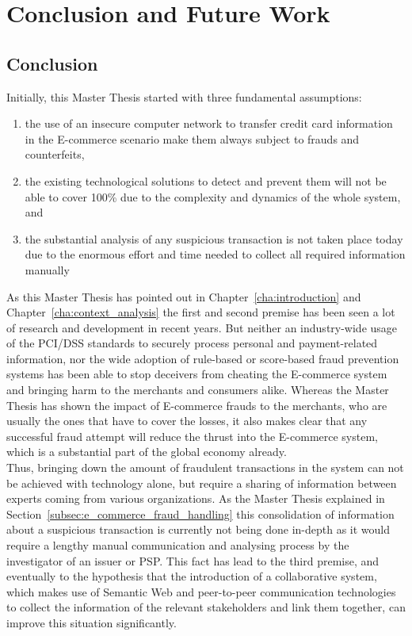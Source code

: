 
\chapter{Conclusion and Future Work} %
\label{cha:conclusion}

\section{Conclusion}
\label{sec:conclusion}

Initially, this Master Thesis started with three fundamental assumptions: \@

\begin{enumerate}
	\item the use of an insecure computer network to transfer credit card information in the \gls{E-commerce} scenario make them always subject to frauds and counterfeits,
	\item the existing technological solutions to detect and prevent them will not be able to cover 100\% due to the complexity and dynamics of the whole system, and
	\item the substantial analysis of any suspicious transaction is not taken place today due to the enormous effort and time needed to collect all required information manually
\end{enumerate}

As this Master Thesis has pointed out in Chapter~\ref{cha:introduction} and Chapter~\ref{cha:context_analysis} the first and second premise has been seen a lot of research and development in recent years. But neither an industry-wide usage of the \gls{PCI/DSS} standards to securely process personal and payment-related information, nor the wide adoption of rule-based or score-based fraud prevention systems has been able to stop deceivers from cheating the \gls{E-commerce} system and bringing harm to the merchants and consumers alike. Whereas the Master Thesis has shown the impact of \gls{E-commerce} frauds to the merchants, who are usually the ones that have to cover the losses, it also makes clear that any successful fraud attempt will reduce the thrust into the \gls{E-commerce} system, which is a substantial part of the global economy already. \\

Thus, bringing down the amount of fraudulent transactions in the system can not be achieved with technology alone, but require a sharing of information between experts coming from various organizations. As the Master Thesis explained in Section~\ref{subsec:e_commerce_fraud_handling} this consolidation of information about a suspicious transaction is currently not being done in-depth as it would require a lengthy manual communication and analysing process by the investigator of an issuer or \gls{PSP}. This fact has lead to the third premise, and eventually to the hypothesis that the introduction of a collaborative system, which makes use of Semantic Web and peer-to-peer communication technologies to collect the information of the relevant stakeholders and link them together, can improve this situation significantly. \\

